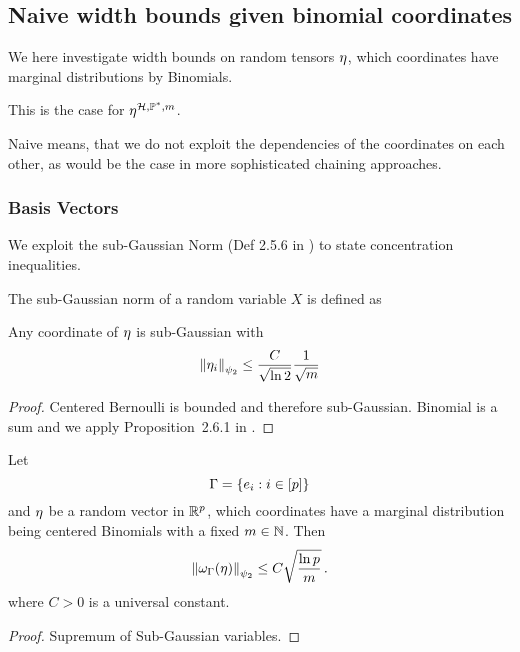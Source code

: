 

\subsection{Naive width bounds given binomial coordinates}\label{sec:directWidthBounds}

We here investigate width bounds on random tensors $\eta$, which coordinates have marginal distributions by Binomials.

This is the case for $\eta^{\mathcal{H},\mathbb{P}^*,m}$.

Naive means, that we do not exploit the dependencies of the coordinates on each other, as would be the case in more sophisticated chaining approaches.

\subsubsection{Basis Vectors}

We exploit the sub-Gaussian Norm (Def 2.5.6 in \cite{vershynin_high-dimensional_2018}) to state concentration inequalities.

\begin{definition}
	The sub-Gaussian norm of a random variable $X$ is defined as
\end{definition}

\begin{theorem}
	Any coordinate of $\eta$ is sub-Gaussian with 
		\[ \left\|\eta_i\right\|_{\psi_2} \leq \frac{C}{\sqrt{\ln2}} \frac{1}{\sqrt{m}} \]
\end{theorem}
\begin{proof}
	Centered Bernoulli is bounded and therefore sub-Gaussian.
	Binomial is a sum and we apply Proposition~2.6.1 in \cite{vershynin_high-dimensional_2018}.
\end{proof}


\begin{theorem}\label{the:basisTensorWidthBound}
	Let 
		\[ \Gamma = \{e_{i} : i \in [p] \}\]
	and $\eta$ be a random vector in $\mathbb{R}^p$, which coordinates have a marginal distribution being centered Binomials with a fixed $m\in\mathbb{N}$.
	Then
		\[ \left\|\omega_{\Gamma}(\eta)\right\|_{\psi_2} \leq C \sqrt{\frac{\ln p}{m}} \, . \]
	where $C>0$ is a universal constant.
\end{theorem}
\begin{proof}
	Supremum of Sub-Gaussian variables.
\end{proof}


